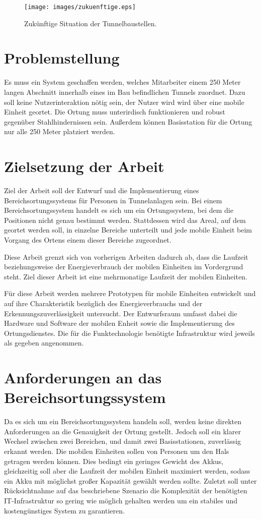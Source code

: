 \begin{figure}[h]
  \centering
	\texttt{[image: images/zukuenftige.eps]}
  \caption{Zukünftige Situation der Tunnelbaustellen.}
  \label{fig:zukuenftige}
\end{figure}

\section{Problemstellung}
Es muss ein System geschaffen werden, welches Mitarbeiter einem 250 Meter langen Abschnitt innerhalb eines im Bau befindlichen Tunnels zuordnet.
Dazu soll keine Nutzerinteraktion nötig sein, der Nutzer wird wird über eine mobile Einheit geortet.
Die Ortung muss unterirdisch funktionieren und robust gegenüber Stahlhindernissen sein.
Außerdem können Basisstation für die Ortung nur alle 250 Meter platziert werden.


\section{Zielsetzung der Arbeit}
\label{ch:Einleitung:sec:Zielsetzung}
Ziel der Arbeit soll der Entwurf und die Implementierung eines Bereichsortungssystems für Personen in Tunnelanlagen sein. 
Bei einem Bereichsortungssystem handelt es sich um ein Ortungssystem, bei dem die Positionen nicht genau bestimmt werden. 
Stattdessen wird das Areal, auf dem geortet werden soll, in einzelne Bereiche unterteilt und jede mobile Einheit beim Vorgang des Ortens einem dieser Bereiche zugeordnet.

Diese Arbeit grenzt sich von vorherigen Arbeiten dadurch ab, dass die Laufzeit beziehungsweise der Energieverbrauch der mobilen Einheiten im Vordergrund steht. 
Ziel dieser Arbeit ist eine mehrmonatige Laufzeit der mobilen Einheiten. 

Für diese Arbeit werden mehrere Prototypen für mobile Einheiten entwickelt und auf ihre Charakteristik bezüglich des Energieverbrauchs und der Erkennungszuverlässigkeit untersucht.
Der Entwurfsraum umfasst dabei die Hardware und Software der mobilen Enheit sowie die Implementierung des Ortungsdienstes. 
Die für die Funktechnologie benötigte Infrastruktur wird jeweils als gegeben angenommen.


\section{Anforderungen an das Bereichsortungssystem}
\label{ch:Einleitung:sec:Anforderungen}
Da es sich um ein Bereichsortungssystem handeln soll, werden keine direkten Anforderungen an die Genauigkeit der Ortung gestellt. 
Jedoch soll ein klarer Wechsel zwischen zwei Bereichen, und damit zwei Basisstationen, zuverlässig erkannt werden. 
Die mobilen Einheiten sollen von Personen um den Hals getragen werden können. 
Dies bedingt ein geringes Gewicht des Akkus, gleichzeitig soll aber die Laufzeit der mobilen Einheit maximiert werden, sodass ein Akku mit möglichst großer Kapazität gewählt werden sollte.
Zuletzt soll unter Rücksichtnahme auf das beschriebene Szenario die Komplexität der benötigten IT-Infrastruktur so gering wie möglich gehalten werden um ein stabiles und kostengünstiges System zu garantieren. 


